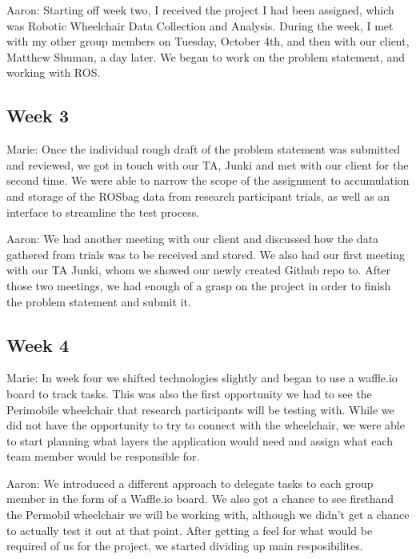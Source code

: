 \documentclass[onecolumn, draftclsnofoot,10pt, compsoc]{IEEEtran}
\begin{document}
Aaron: Starting off week two, I received the project I had been assigned, which was Robotic Wheelchair Data Collection and Analysis. During the week, I met with my other group members on Tuesday, October 4th, and then with our client, Matthew Shuman, a day later. We began to work on the problem statement, and working with ROS.\par

\subsection{Week 3}
Marie: Once the individual rough draft of the problem statement was submitted and reviewed, we got in touch with our TA, Junki and met with our client for the second time. We were able to narrow the scope of the assignment to accumulation and storage of the ROSbag data from research participant trials, as well as an interface to streamline the test process.\par

Aaron: We had another meeting with our client and discussed how the data gathered from trials was to be received and stored. We also had our first meeting with our TA Junki, whom we showed our newly created Github repo to. After those two meetings, we had enough of a grasp on the project in order to finish the problem statement and submit it.\par

\subsection{Week 4}
Marie: In week four we shifted technologies slightly and began to use a waffle.io board to track tasks. This was also the first opportunity we had to see the Perimobile wheelchair that research participants will be testing with. While we did not have the opportunity to try to connect with the wheelchair, we were able to start planning what layers the application would need and assign what each team member would be responsible for.\par

Aaron: We introduced a different approach to delegate tasks to each group member in the form of a Waffle.io board. We also got a chance to see firsthand the Permobil wheelchair we will be working with, although we didn't get a chance to actually test it out at that point. After getting a feel for what would be required of us for the project, we started dividing up main resposibilites.\par
\end{document}
